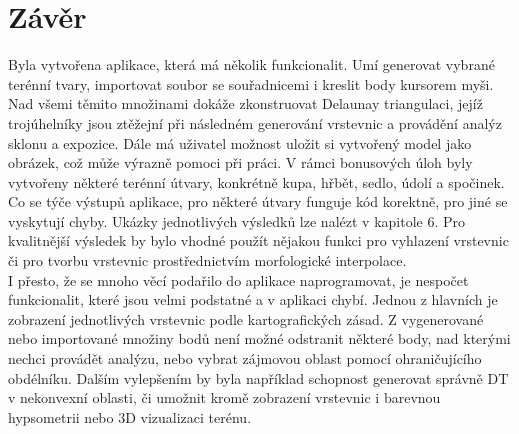 \documentclass[a4paper,11pt,twoside]{article}
\begin{document}
\section*{Závěr}
\noindent
\large
Byla vytvořena aplikace, která má několik funkcionalit. Umí generovat vybrané terénní tvary, importovat soubor se souřadnicemi i kreslit body kursorem myši. Nad všemi těmito množinami dokáže zkonstruovat Delaunay triangulaci, jejíž trojúhelníky jsou ztěžejní při následném generování vrstevnic a provádění analýz sklonu a expozice. Dále má uživatel možnost uložit si vytvořený model jako obrázek, což může výrazně pomoci při práci. V rámci bonusových úloh byly vytvořeny některé terénní útvary, konkrétně kupa, hřbět, sedlo, údolí a spočinek. Co se týče výstupů aplikace, pro některé útvary funguje kód korektně, pro jiné se vyskytují chyby. Ukázky jednotlivých výsledků lze nalézt v kapitole 6. Pro kvalitnější výsledek by bylo vhodné použít nějakou funkci pro vyhlazení vrstevnic či pro tvorbu vrstevnic prostřednictvím morfologické interpolace.\\
\indent I přesto, že se mnoho věcí podařilo do aplikace naprogramovat, je nespočet funkcionalit, které jsou velmi podstatné a v aplikaci chybí. Jednou z hlavních je zobrazení jednotlivých vrstevnic podle kartografických zásad. Z vygenerované nebo importované množiny bodů není možné odstranit některé body, nad kterými nechci provádět analýzu, nebo vybrat zájmovou oblast pomocí ohraničujícího obdélníku. Dalším vylepšením by byla například schopnost generovat správně DT v nekonvexní oblasti, či umožnit kromě zobrazení vrstevnic i barevnou hypsometrii nebo 3D vizualizaci terénu.




\newpage
\vspace*{-6ex}
\renewcommand{\refname}{Literatura} 
    
    
 
\end{document}

